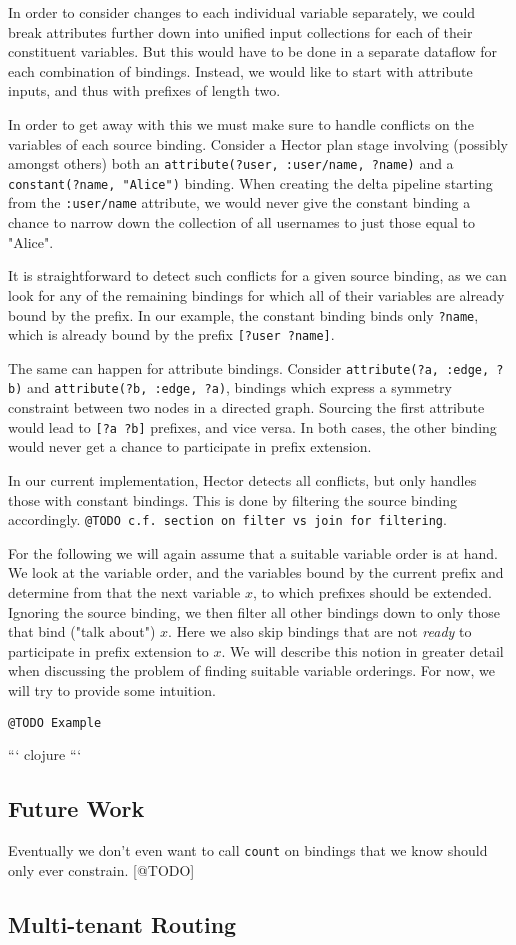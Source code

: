 \documentclass[../index.tex]{subfiles}
\begin{document}
In order to consider changes to each individual variable separately,
we could break attributes further down into unified input collections
for each of their constituent variables. But this would have to be
done in a separate dataflow for each combination of bindings. Instead,
we would like to start with attribute inputs, and thus with prefixes
of length two.

In order to get away with this we must make sure to handle conflicts
on the variables of each source binding. Consider a Hector plan stage
involving (possibly amongst others) both an \texttt{attribute(?user,
  :user/name, ?name)} and a \texttt{constant(?name, "Alice")}
binding. When creating the delta pipeline starting from the
\texttt{:user/name} attribute, we would never give the constant
binding a chance to narrow down the collection of all usernames to
just those equal to "Alice".

It is straightforward to detect such conflicts for a given source
binding, as we can look for any of the remaining bindings for which
all of their variables are already bound by the prefix. In our
example, the constant binding binds only \texttt{?name}, which is
already bound by the prefix \texttt{[?user ?name]}.

The same can happen for attribute bindings. Consider
\texttt{attribute(?a, :edge, ?b)} and \texttt{attribute(?b, :edge,
  ?a)}, bindings which express a symmetry constraint between two nodes
in a directed graph. Sourcing the first attribute would lead to
\texttt{[?a ?b]} prefixes, and vice versa. In both cases, the other
binding would never get a chance to participate in prefix extension.

In our current implementation, Hector detects all conflicts, but only
handles those with constant bindings. This is done by filtering the
source binding accordingly. \texttt{@TODO c.f. section on filter vs join for
filtering}.

For the following we will again assume that a suitable variable order
is at hand. We look at the variable order, and the variables bound by
the current prefix and determine from that the next variable $x$, to
which prefixes should be extended. Ignoring the source binding, we
then filter all other bindings down to only those that bind ("talk
about") $x$. Here we also skip bindings that are not \emph{ready} to
participate in prefix extension to $x$. We will describe this notion
in greater detail when discussing the problem of finding suitable
variable orderings. For now, we will try to provide some intuition.

\texttt{@TODO Example}

``` clojure
```

\subsection{Future Work}

Eventually we don't even want to call \texttt{count} on bindings that
we know should only ever constrain. [@TODO]

\subsection{Multi-tenant Routing}
\end{document}
